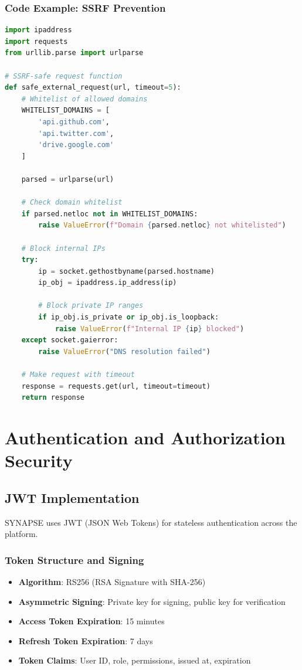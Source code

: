\documentclass{report}
\begin{document}
\subsection{Code Example: SSRF Prevention}
\begin{lstlisting}[language=Python]
import ipaddress
import requests
from urllib.parse import urlparse

# SSRF-safe request function
def safe_external_request(url, timeout=5):
    # Whitelist of allowed domains
    WHITELIST_DOMAINS = [
        'api.github.com',
        'api.twitter.com',
        'drive.google.com'
    ]
    
    parsed = urlparse(url)
    
    # Check domain whitelist
    if parsed.netloc not in WHITELIST_DOMAINS:
        raise ValueError(f"Domain {parsed.netloc} not whitelisted")
    
    # Block internal IPs
    try:
        ip = socket.gethostbyname(parsed.hostname)
        ip_obj = ipaddress.ip_address(ip)
        
        # Block private IP ranges
        if ip_obj.is_private or ip_obj.is_loopback:
            raise ValueError(f"Internal IP {ip} blocked")
    except socket.gaierror:
        raise ValueError("DNS resolution failed")
    
    # Make request with timeout
    response = requests.get(url, timeout=timeout)
    return response
\end{lstlisting}


\chapter{Authentication and Authorization Security}

\section{JWT Implementation}

SYNAPSE uses JWT (JSON Web Tokens) for stateless authentication across the platform.

\subsection{Token Structure and Signing}
\begin{itemize}
\item \textbf{Algorithm}: RS256 (RSA Signature with SHA-256)
\item \textbf{Asymmetric Signing}: Private key for signing, public key for verification
\item \textbf{Access Token Expiration}: 15 minutes
\item \textbf{Refresh Token Expiration}: 7 days
\item \textbf{Token Claims}: User ID, role, permissions, issued at, expiration
\end{itemize}
\end{document}
